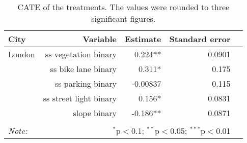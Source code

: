 \begin{table}[!htp]\centering
\caption{CATE of the treatments. The values were rounded to three significant figures.}\label{result:tab:cf}
\scriptsize
\begin{tabular}{lrrrr}\toprule
City&Variable&Estimate &Standard error \\ \midrule
London & ss vegetation binary & 0.224** & 0.0901 \\
 & ss bike lane binary & 0.311* & 0.175 \\
 & ss parking binary & -0.00837 & 0.115 \\
 & ss street light binary & 0.156* & 0.0831 \\
 & slope binary & -0.186** & 0.0871 \\
\hline
\hline \\[-1.8ex]
\textit{Note:}  & \multicolumn{3}{r}{$^{*}$p$<$0.1; $^{**}$p$<$0.05; $^{***}$p$<$0.01} \\
\end{tabular}
\end{table}
